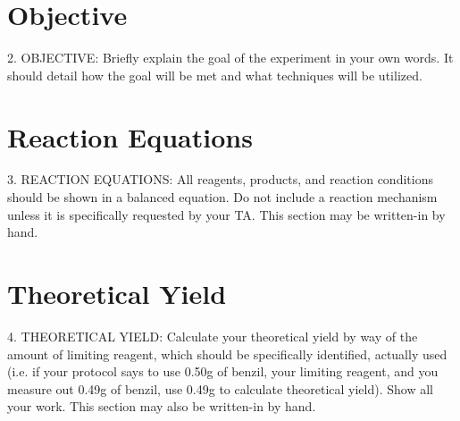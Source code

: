 \documentclass[letterpaper,amsmath,amssymb,prb,preprint,12pt]{revtex4-1}%
\begin{document}


\section{Objective}


2. OBJECTIVE: Briefly explain the goal of the experiment in your own words. It
should detail how the goal will be met and what techniques will be utilized.

\section{Reaction Equations}


3. REACTION EQUATIONS: All reagents, products, and reaction conditions should
be shown in a balanced equation. Do not include a reaction mechanism unless it is
specifically requested by your TA. This section may be written-in by hand.

\section{Theoretical Yield}


4. THEORETICAL YIELD: Calculate your theoretical yield by way of the amount of
limiting reagent, which should be specifically identified, actually used (i.e. if your
protocol says to use 0.50g of benzil, your limiting reagent, and you measure out
0.49g of benzil, use 0.49g to calculate theoretical yield). Show all your work. This
section may also be written-in by hand.
\end{document}
